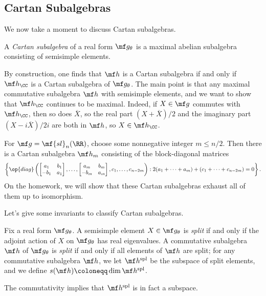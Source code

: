 \documentclass[../notes.tex]{subfiles}
\begin{document}
\subsection{Cartan Subalgebras}
We now take a moment to discuss Cartan subalgebras.
\begin{definition}[Cartan]
	A \textit{Cartan subalgebra} of a real form $\mf g_\theta$ is a maximal abelian subalgebra consisting of semisimple elements.
\end{definition}
\begin{remark}
	By construction, one finds that $\mf h$ is a Cartan subalgebra if and only if $\mf h_\CC$ is a Cartan subalgebra of $\mf g_\theta$. The main point is that any maximal commutative subalgebra $\mf h$ with semisimple elements, and we want to show that $\mf h_\CC$ continues to be maximal. Indeed, if $X\in\mf g$ commutes with $\mf h_\CC$, then so does $\overline X$, so the real part $(X+\overline X)/2$ and the imaginary part $(X-i\overline X)/2i$ are both in $\mf h$, so $X\in\mf h_\CC$.
\end{remark}
\begin{example}
	For $\mf g=\mf{sl}_n(\RR)$, choose some nonnegative integer $m\le n/2$. Then there is a Cartan subalgebra $\mf h_m$ consisting of the block-diagonal matrices
	\[\left\{\op{diag}\left(\begin{bmatrix}
		a_1 & b_1 \\ -b_1 & a_1
	\end{bmatrix},\ldots,\begin{bmatrix}
		a_m & b_m \\ -b_m & a_m
	\end{bmatrix},c_1,\ldots,c_{n-2m}\right):2(a_1+\cdots+a_m)+(c_1+\cdots+c_{n-2m})=0\right\}.\]
	On the homework, we will show that these Cartan subalgebras exhaust all of them up to isomorphism.
\end{example}
Let's give some invariants to classify Cartan subalgebras.
\begin{definition}[split]
	Fix a real form $\mf g_\theta$. A semisimple element $X\in\mf g_\theta$ is \textit{split} if and only if the adjoint action of $X$ on $\mf g_\theta$ has real eigenvalues. A commutative subalgebra $\mf h$ of $\mf g_\theta$ is \textit{split} if and only if all elements of $\mf h$ are split; for any commutative subalgebra $\mf h$, we let $\mf h^{\mathrm{spl}}$ be the subspace of split elements, and we define $s(\mf h)\coloneqq\dim\mf h^{\mathrm{spl}}$.
\end{definition}
\begin{remark}
	The commutativity implies that $\mf h^{\mathrm{spl}}$ is in fact a subspace.
\end{remark}
\end{document}
